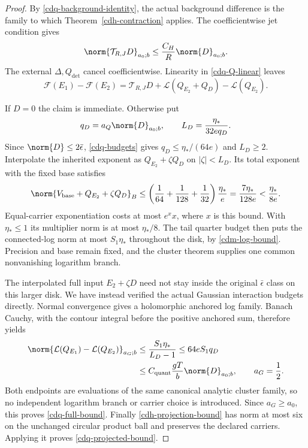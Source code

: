 \begin{proof}
By \eqref{cdq-background-identity}, the actual background
difference is the family to which
Theorem~\ref{cdh-contraction} applies. The coefficientwise
jet condition gives
\begin{equation}
 \norm{\mathcal T_{R,J}D}_{a_0;b}
                  \le\frac{C_H}{R}\norm{D}_{a_0;b}.
 \label{cdq-background-bound}
\end{equation}
The external $\Delta,Q_{\det}$ cancel coefficientwise.
Linearity in \eqref{cdq-Q-linear} leaves
\[
 \mathscr F(E_1)-\mathscr F(E_2)
   =\mathcal T_{R,J}D
       +\mathcal L(Q_{E_2}+Q_D)-\mathcal L(Q_{E_2}).
\]

If $D=0$ the claim is immediate. Otherwise put
\begin{equation}
 q_D=a_Q\norm{D}_{a_0;b},\qquad
 L_D=\frac{\eta_*}{32e q_D}.
 \label{cdq-interpolation-radius}
\end{equation}
Since $\norm{D}\le2\bar\epsilon$,
\eqref{cdq-budgets} gives $q_D\le\eta_*/(64e)$ and
$L_D\ge2$. Interpolate the inherited exponent as
$Q_{E_2}+\zeta Q_D$ on $|\zeta|<L_D$. Its total exponent
with the fixed base satisfies
\begin{equation}
 \norm{V_{\mathrm{base}}+Q_{E_2}+\zeta Q_D}_B
 \le
 \left(\frac1{64}+\frac1{128}+\frac1{32}\right)
              \frac{\eta_*}{e}
 =\frac{7\eta_*}{128e}<\frac{\eta_*}{8e}.
 \label{cdq-exponent-budget}
\end{equation}
Equal-carrier exponentiation costs at most $e^xx$, where
$x$ is this bound. With $\eta_*\le1$ its multiplier norm
is at most $\eta_*/8$. The tail quarter budget then puts
the connected-log norm at most $S_1\eta_*$ throughout the
disk, by \eqref{cdm-log-bound}. Precision and base remain
fixed, and the cluster theorem supplies one common
nonvanishing logarithm branch.

The interpolated full input $E_2+\zeta D$ need not stay
inside the original $\bar\epsilon$ class on this larger
disk. We have instead verified the actual Gaussian
interaction budgets directly. Normal convergence gives
a holomorphic anchored log family. Banach Cauchy, with
the contour integral before the positive anchored sum,
therefore yields
\begin{align}
 \norm{\mathcal L(Q_{E_1})-\mathcal L(Q_{E_2})}_{a_G;b}
 &\le\frac{S_1\eta_*}{L_D-1}
 \le64eS_1q_D\notag\\
 &\le C_{\mathrm{quant}}\frac{gT}{b}\norm{D}_{a_0;b},
 \qquad a_G=\frac12.
 \label{cdq-log-bound}
\end{align}
Both endpoints are evaluations of the same canonical
analytic cluster family, so no independent logarithm
branch or carrier choice is introduced. Since
$a_G\ge a_0$, this proves \eqref{cdq-full-bound}.
Finally \eqref{cdh-projection-bound} has norm at most
six on the unchanged circular product ball and preserves
the declared carriers. Applying it proves
\eqref{cdq-projected-bound}.
\end{proof}

